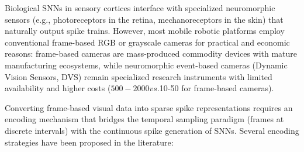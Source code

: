 Biological SNNs in sensory cortices interface with specialized neuromorphic sensors (e.g., photoreceptors in the retina, 
mechanoreceptors in the skin) that naturally output spike trains. However, most mobile robotic platforms employ conventional 
frame-based RGB or grayscale cameras for practical and economic reasons: frame-based cameras are mass-produced commodity 
devices with mature manufacturing ecosystems, while neuromorphic event-based cameras (Dynamic Vision Sensors, DVS) remain 
specialized research instruments with limited availability and higher costs ($500-2000 vs. $10-50 for frame-based cameras).

Converting frame-based visual data into sparse spike representations requires an encoding mechanism that bridges the 
temporal sampling paradigm (frames at discrete intervals) with the continuous spike generation of SNNs. Several encoding 
strategies have been proposed in the literature:

